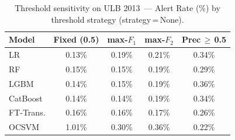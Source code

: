 \begin{table}[H]
\centering
\caption{Threshold sensitivity on ULB 2013~--- Alert Rate (\%) by threshold strategy (strategy\,=\,None).}
\label{tab:threshold_ulb_alert}
\begin{tabular}{l c c c c}
\toprule
Model & Fixed (0.5) & max-$F_1$ & max-$F_2$ & Prec\,$\geq$\,0.5 \\
\midrule
LR         & 0.13\% & 0.19\% & 0.21\% & 0.34\% \\
RF         & 0.15\% & 0.15\% & 0.19\% & 0.29\% \\
LGBM       & 0.14\% & 0.15\% & 0.19\% & 0.36\% \\
CatBoost   & 0.14\% & 0.14\% & 0.19\% & 0.34\% \\
FT-Trans.  & 0.16\% & 0.16\% & 0.17\% & 0.26\% \\
OCSVM      & 1.01\% & 0.30\% & 0.36\% & 0.22\% \\
\bottomrule
\end{tabular}
\end{table}